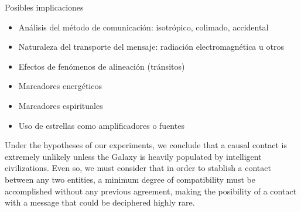 \documentclass[useAMS,usenatbib]{mnras}
\begin{document}
 




Posibles implicaciones
\begin{itemize}
   \item Análisis del método de comunicación: isotrópico, colimado, accidental
   \item Naturaleza del transporte del mensaje: radiación electromagnética u otros
   \item Efectos de fenómenos de alineación (tránsitos)
   \item Marcadores energéticos
   \item Marcadores espirituales
   \item Uso de estrellas como amplificadores o fuentes
\end{itemize}




Under the hypotheses of our experiments, we conclude that
a causal contact is extremely unlikely unless the Galaxy is heavily
populated by intelligent civilizations.
%
Even so, we must consider that in order to stablish a contact between
any two entities, a minimum degree of compatibility must be
accomplished without any previous agreement, 
making the posibility of a contact with a message that
could be deciphered highly rare.
 




\end{document}
